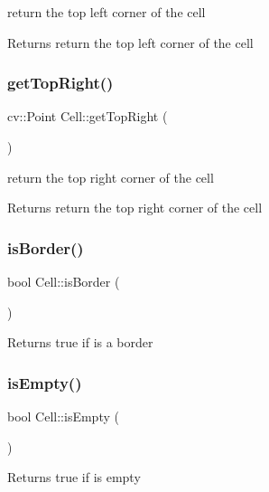 return the top left corner of the cell \begin{DoxyReturn}{Returns}
return the top left corner of the cell 
\end{DoxyReturn}
\mbox{\label{class_cell_a4b08bffc22a4393fd86c9608d9723d7c}} 
\subsubsection{\texorpdfstring{get\+Top\+Right()}{getTopRight()}}
{\footnotesize\ttfamily cv\+::\+Point Cell\+::get\+Top\+Right (\begin{DoxyParamCaption}{ }\end{DoxyParamCaption})}

return the top right corner of the cell \begin{DoxyReturn}{Returns}
return the top right corner of the cell 
\end{DoxyReturn}
\mbox{\label{class_cell_a34d62b7c65fd85f356bd9e2c3058edcb}} 
\subsubsection{\texorpdfstring{is\+Border()}{isBorder()}}
{\footnotesize\ttfamily bool Cell\+::is\+Border (\begin{DoxyParamCaption}{ }\end{DoxyParamCaption})}

\begin{DoxyReturn}{Returns}
true if is a border 
\end{DoxyReturn}
\mbox{\label{class_cell_a6c7344ef2aa917e70364221bf86ff8bc}} 
\subsubsection{\texorpdfstring{is\+Empty()}{isEmpty()}}
{\footnotesize\ttfamily bool Cell\+::is\+Empty (\begin{DoxyParamCaption}{ }\end{DoxyParamCaption})}

\begin{DoxyReturn}{Returns}
true if is empty 
\end{DoxyReturn}
\mbox{\label{class_cell_aaf13f5d308c7f1eb670a050e4fc6dc28}} 
